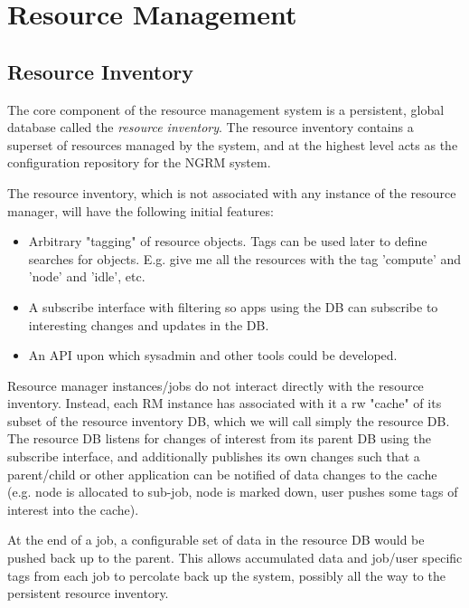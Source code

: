 \section{Resource Management}

\subsection{Resource Inventory}

The core component of the resource management system is
a persistent, global database called the {\em resource inventory}.
The resource inventory contains a superset of resources managed
by the system, and at the highest level acts as the configuration
repository for the NGRM system.

The resource inventory, which is not associated with any instance
of the resource manager, will have the following initial features:

\begin{itemize}
\item{Arbitrary "tagging" of resource objects. Tags can be used later
   to define searches for objects. E.g. give me all the resources
   with the tag 'compute' and 'node' and 'idle', etc.}

\item{A subscribe interface with filtering so apps using the DB can
   subscribe to interesting changes and updates in the DB.}

\item{An API upon which sysadmin and other tools could be developed.}
\end{itemize}

Resource manager instances/jobs do not interact directly with
the resource inventory.  Instead, each RM instance has associated
with it a rw "cache" of its subset of the resource inventory DB,
which we will call simply the resource DB.  The resource DB
listens for changes of interest from its parent DB using
the subscribe interface, and additionally publishes its own
changes such that a parent/child or other application can
be notified of data changes to the cache (e.g. node is allocated
to sub-job, node is marked down, user pushes some tags of
interest into the cache).

At the end of a job, a configurable set of data in the
resource DB would be pushed back up to the parent. This
allows accumulated data and job/user specific tags from
each job to percolate back up the system, possibly all
the way to the persistent resource inventory.

